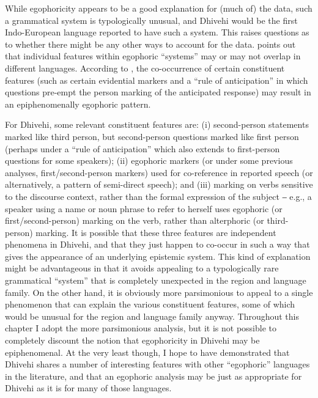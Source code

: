 \documentclass[output=paper]{langsci/langscibook}
\begin{document}
While egophoricity appears to be a good explanation for (much of) the data, such a grammatical system is typologically unusual, and Dhivehi would be the first Indo-European language reported to have such a system. This raises questions as to whether there might be any other ways to account for the data. \cite[83–84]{Gawne2017} points out that individual features within egophoric “systems” may or may not overlap in different languages. According to \citeauthor{Gawne2017}, the co-occurrence of certain constituent features (such as certain evidential markers and a “rule of anticipation” in which questions pre-empt the person marking of the anticipated response) may result in an epiphenomenally egophoric pattern.

For Dhivehi, some relevant constituent features are: (i) second-person statements marked like third person, but second-person questions marked like first person (perhaps under a “rule of anticipation” which also extends to first-person questions for some speakers); (ii) egophoric markers (or under some previous analyses, first/second-person markers) used for co-reference in reported speech (or alternatively, a pattern of semi-direct speech); and (iii) marking on verbs sensitive to the discourse context, rather than the formal expression of the subject ‒ e.g., a speaker using a name or noun phrase to refer to herself uses egophoric (or first/second-person) marking on the verb, rather than alterphoric (or third-person) marking. It is possible that these three features are independent phenomena in Dhivehi, and that they just happen to co-occur in such a way that gives the appearance of an underlying epistemic system. This kind of explanation might be advantageous in that it avoids appealing to a typologically rare grammatical “system” that is completely unexpected in the region and language family. On the other hand, it is obviously more parsimonious to appeal to a single phenomenon that can explain the various constituent features, some of which would be unusual for the region and language family anyway. Throughout this chapter I adopt the more parsimonious analysis, but it is not possible to completely discount the notion that egophoricity in Dhivehi may be epiphenomenal. At the very least though, I hope to have demonstrated that Dhivehi shares a number of interesting features with other “egophoric” languages in the literature, and that an egophoric analysis may be just as appropriate for Dhivehi as it is for many of those languages.
\end{document}
